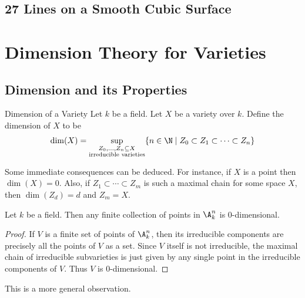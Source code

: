 \documentclass[a4paper]{article}
\begin{document}
\subsection{27 Lines on a Smooth Cubic Surface}

\pagebreak
\section{Dimension Theory for Varieties}
\subsection{Dimension and its Properties}
\begin{defn}{Dimension of a Variety}{} Let $k$ be a field. Let $X$ be a variety over $k$. Define the dimension of $X$ to be $$\dim(X)=\sup_{\substack{Z_0,\dots,Z_n\subseteq X\\\text{irreducible varieties}}}\{n\in\N\;|\;Z_0\subset Z_1\subset\dots\subset Z_n\}$$
\end{defn}

Some immediate consequences can be deduced. For instance, if $X$ is a point then $\dim(X)=0$. Also, if $Z_1\subset\cdots\subset Z_m$ is such a maximal chain for some space $X$, then $\dim(Z_d)=d$ and $Z_m=X$. 

\begin{eg}{}{} Let $k$ be a field. Then any finite collection of points in $\A_k^n$ is $0$-dimensional. 
\begin{proof}
If $V$ is a finite set of points of $\A_k^n$, then its irreducible components are precisely all the points of $V$ as a set. Since $V$ itself is not irreducible, the maximal chain of irreducible subvarieties is just given by any single point in the irreducible components of $V$. Thus $V$ is $0$-dimensional. 
\end{proof}
\end{eg}

This is a more general observation. 
\end{document}

